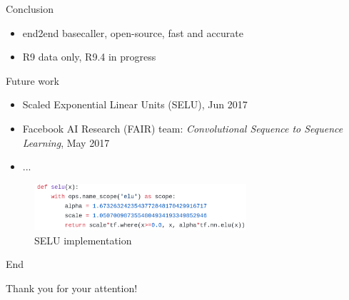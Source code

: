 \documentclass[10pt]{beamer}
\begin{document}
\begin{frame}[fragile]{Conclusion}
	\begin{itemize}
		\item end2end basecaller, open-source, fast and accurate
		\item R9 data only, R9.4 in progress
	\end{itemize}
\end{frame}

\begin{frame}[fragile]{Future work}
	\begin{itemize}
		\item<1-> Scaled Exponential Linear Units (SELU), Jun 2017
		\item<3-> Facebook AI Research (FAIR) team: \textit{Convolutional Sequence to Sequence Learning}, May 2017
		\item<4-> ...
	\end{itemize}
	
	 {
		\begin{figure}

			\begin{center}
				\includegraphics[width=0.7\textwidth]{./imgs/selu_tf.png}%
				\caption{SELU implementation}				
			\end{center}
		\end{figure}
	}
\end{frame}

\begin{frame}[fragile]{End}
	\vfill
	\begin{center}  
		Thank you for your attention!
	\end{center}
	
	\vfill
\end{frame}
\end{document}
